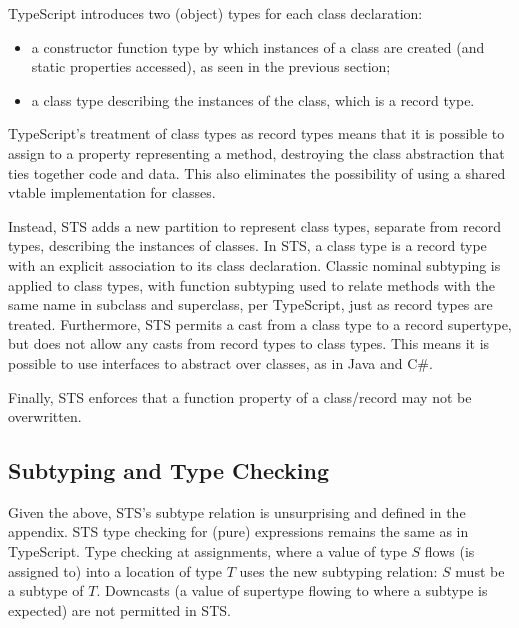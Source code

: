 TypeScript introduces two (object) types for each class declaration:
\begin{itemize}
\item a constructor function type by which instances of a class
are created (and static properties accessed), as seen in the previous section;
\item a class type describing the instances of the class, which is a record type.
\end{itemize}
TypeScript's treatment of class types as record types
means that it is possible to assign to a property representing a method,
destroying the class abstraction that ties together code and data.
This also eliminates the possibility of using a shared vtable implementation for classes.

Instead, STS adds a new partition to represent class types, separate from record types,
describing the instances of classes. In STS, a class type is a
record type with an explicit association to its class declaration.
Classic nominal subtyping is applied to class types, with function subtyping used to relate methods with
the same name in subclass and superclass, per TypeScript, just as record types are treated.
Furthermore, STS permits a cast from a class type
to a record supertype, but does not allow any casts from record types to class types. This means
it is possible to use interfaces to abstract over classes, as in Java and C\#.

Finally, STS enforces that a function property of a class/record may not be overwritten. 

\subsection{Subtyping and Type Checking}

Given the above, STS's subtype relation is unsurprising and defined in the appendix.
STS type checking for (pure) expressions remains the same as in TypeScript.
Type checking at assignments, where a value of type $S$ flows (is assigned to)
into a location of type $T$ uses the new subtyping relation: $S$
must be a subtype of $T$.  Downcasts (a value of supertype flowing to where a subtype
is expected) are not permitted in STS.



